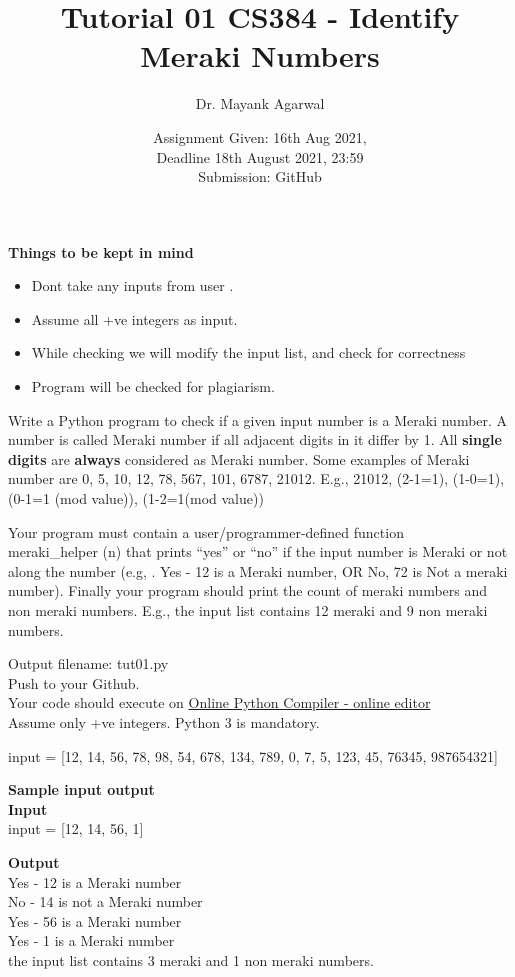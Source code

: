 \documentclass[12pt,  letterpaper,  twoside]{article}
\title{Tutorial 01 CS384 - Identify Meraki Numbers}
\author{Dr. Mayank Agarwal}
\date{Assignment Given: 16th Aug 2021,\\ Deadline 18th August 2021,  
23:59\\Submission: GitHub }
\begin{document}
	\maketitle  
	\textbf{Things to be kept in mind}\\
	\begin{itemize}
		\item Dont take any inputs from user . 
		\item Assume all +ve integers as input.
		\item While checking we will modify the input list, and check for 
		correctness 
		\item Program will be checked for plagiarism. 
		
	\end{itemize}
	
	Write a Python program to check if a given input number is a Meraki number. A number is called Meraki number if all adjacent digits in it differ by 1. All \textbf{single digits }are \textbf{always }considered as Meraki number. Some examples of Meraki number are 0,  5,  10,  12,  78,  567,  101,  6787,  21012.  E.g.,  21012,  (2-1=1),  (1-0=1),  (0-1=1 (mod value)),  (1-2=1(mod value))
	
	
	 Your program must contain a user/programmer-defined function \\  meraki\_helper (n) that prints “yes” or “no” if the input number is Meraki or not along the number (e.g, . Yes - 12 is a Meraki number,  OR No,  72 is Not a meraki number). Finally your program should print the count of meraki numbers and non meraki numbers. E.g., the input list contains 12 meraki and 9 non meraki numbers.
	  
	 Output filename: tut01.py \\
	 Push to your Github. \\
	 Your code should execute on
	 \href{https://www.onlinegdb.com/online_python_compiler}{Online Python Compiler - online editor} \\
	 Assume only +ve integers. Python 3 is mandatory.
	 
	 input = [12,  14, 56, 78, 98, 54, 678, 134, 789, 0, 7, 5,  123,  45, 76345,  987654321]
	
	
	\textbf{Sample input output }\\
	
	 \textbf{Input}\\
		\noindent	input = [12,  14, 56, 1]
	
	 \textbf{Output}\\
	\noindent	
	Yes - 12 is a Meraki number \\
		No - 14 is not a Meraki number \\
			Yes - 56 is a Meraki number \\
				Yes - 1 is a Meraki number \\
	 the input list contains 3 meraki and 1 non meraki numbers.
\end{document}

